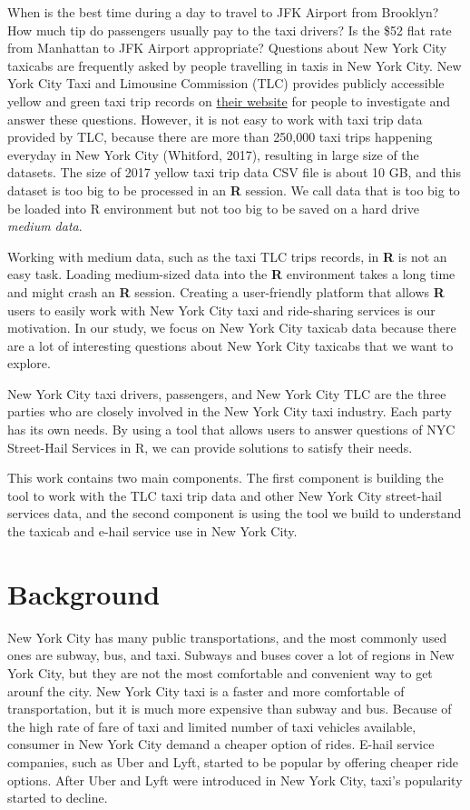 \documentclass[12pt,twoside]{reedthesis}
\theoremstyle{definition}
\theoremstyle{definition}
\theoremstyle{definition}
\theoremstyle{remark}
\begin{document}
When is the best time during a day to travel to JFK Airport from
Brooklyn? How much tip do passengers usually pay to the taxi drivers? Is
the \$52 flat rate from Manhattan to JFK Airport appropriate? Questions
about New York City taxicabs are frequently asked by people travelling
in taxis in New York City. New York City Taxi and Limousine Commission
(TLC) provides publicly accessible yellow and green taxi trip records on
\href{http://www.nyc.gov/html/tlc/html/about/trip_record_data.shtml}{their
website} for people to investigate and answer these questions. However,
it is not easy to work with taxi trip data provided by TLC, because
there are more than 250,000 taxi trips happening everyday in New York
City (Whitford, 2017), resulting in large size of the datasets. The size
of 2017 yellow taxi trip data CSV file is about 10 GB, and this dataset
is too big to be processed in an \textbf{R} session. We call data that
is too big to be loaded into R environment but not too big to be saved
on a hard drive \emph{medium data}.

Working with medium data, such as the taxi TLC trips records, in
\textbf{R} is not an easy task. Loading medium-sized data into the
\textbf{R} environment takes a long time and might crash an \textbf{R}
session. Creating a user-friendly platform that allows \textbf{R} users
to easily work with New York City taxi and ride-sharing services is our
motivation. In our study, we focus on New York City taxicab data because
there are a lot of interesting questions about New York City taxicabs
that we want to explore.

New York City taxi drivers, passengers, and New York City TLC are the
three parties who are closely involved in the New York City taxi
industry. Each party has its own needs. By using a tool that allows
users to answer questions of NYC Street-Hail Services in R, we can
provide solutions to satisfy their needs.

This work contains two main components. The first component is building
the tool to work with the TLC taxi trip data and other New York City
street-hail services data, and the second component is using the tool we
build to understand the taxicab and e-hail service use in New York City.

\section{Background}\label{background}

New York City has many public transportations, and the most commonly
used ones are subway, bus, and taxi. Subways and buses cover a lot of
regions in New York City, but they are not the most comfortable and
convenient way to get arounf the city. New York City taxi is a faster
and more comfortable of transportation, but it is much more expensive
than subway and bus. Because of the high rate of fare of taxi and
limited number of taxi vehicles available, consumer in New York City
demand a cheaper option of rides. E-hail service companies, such as Uber
and Lyft, started to be popular by offering cheaper ride options. After
Uber and Lyft were introduced in New York City, taxi's popularity
started to decline.
\end{document}
